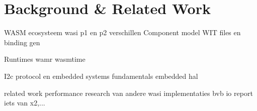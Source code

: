 \chapter{Background \& Related Work}
\label{chap:2}

WASM ecosysteem
wasi p1 en p2 verschillen
Component model
WIT files en binding gen

Runtimes
wamr
wasmtime

I2c protocol en embedded systems
fundamentals
embedded hal

related work
performance research van andere wasi implementaties bvb io report iets van x2,...